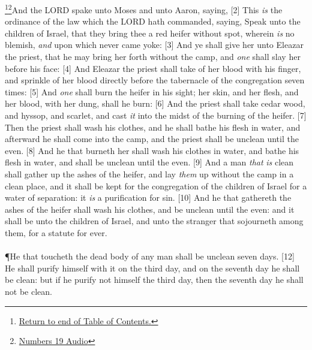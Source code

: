 
\footnote{\textcolor[rgb]{0.00,0.25,0.00}{\hyperlink{NumbersTOC}{Return to end of Table of Contents.}}}\footnote{\href{https://audiobible.com/bible/numbers_19.html}{\textcolor[cmyk]{0.99998,1,0,0}{Numbers 19 Audio}}}\textcolor[cmyk]{0.99998,1,0,0}{And the LORD spake unto Moses and unto Aaron, saying,}
[2] \textcolor[cmyk]{0.99998,1,0,0}{This \emph{is} the ordinance of the law which the LORD hath commanded, saying, Speak unto the children of Israel, that they bring thee a red heifer without spot, wherein \emph{is} no blemish, \emph{and} upon which never came yoke:}
[3] \textcolor[cmyk]{0.99998,1,0,0}{And ye shall give her unto Eleazar the priest, that he may bring her forth without the camp, and \emph{one} shall slay her before his face:}
[4] \textcolor[cmyk]{0.99998,1,0,0}{And Eleazar the priest shall take of her blood with his finger, and sprinkle of her blood directly before the tabernacle of the congregation seven times:}
[5] \textcolor[cmyk]{0.99998,1,0,0}{And \emph{one} shall burn the heifer in his sight; her skin, and her flesh, and her blood, with her dung, shall he burn:}
[6] \textcolor[cmyk]{0.99998,1,0,0}{And the priest shall take cedar wood, and hyssop, and scarlet, and cast \emph{it} into the midst of the burning of the heifer.}
[7] \textcolor[cmyk]{0.99998,1,0,0}{Then the priest shall wash his clothes, and he shall bathe his flesh in water, and afterward he shall come into the camp, and the priest shall be unclean until the even.}
[8] \textcolor[cmyk]{0.99998,1,0,0}{And he that burneth her shall wash his clothes in water, and bathe his flesh in water, and shall be unclean until the even.}
[9] \textcolor[cmyk]{0.99998,1,0,0}{And a man \emph{that} \emph{is} clean shall gather up the ashes of the heifer, and lay \emph{them} up without the camp in a clean place, and it shall be kept for the congregation of the children of Israel for a water of separation: it \emph{is} a purification for sin.}
[10] \textcolor[cmyk]{0.99998,1,0,0}{And he that gathereth the ashes of the heifer shall wash his clothes, and be unclean until the even: and it shall be unto the children of Israel, and unto the stranger that sojourneth among them, for a statute for ever.}\\
\\
\P \textcolor[cmyk]{0.99998,1,0,0}{He that toucheth the dead body of any man shall be unclean seven days.}
[12] \textcolor[cmyk]{0.99998,1,0,0}{He shall purify himself with it on the third day, and on the seventh day he shall be clean: but if he purify not himself the third day, then the seventh day he shall not be clean.}
